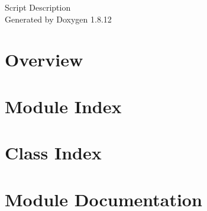 \documentclass[twoside]{book}
\newcommand{\+}{\discretionary{\mbox{\scriptsize$\hookleftarrow$}}{}{}}
\newcommand{\clearemptydoublepage}{%
  \newpage{\pagestyle{empty}\cleardoublepage}%
}
\begin{document}
\hypersetup{pageanchor=false,
             bookmarksnumbered=true,
             pdfencoding=unicode
            }
\begin{titlepage}
\vspace*{7cm}
\begin{center}%
{\Large Script Description }\\
\vspace*{1cm}
{\large Generated by Doxygen 1.8.12}\\
\end{center}
\end{titlepage}
\clearemptydoublepage
{}
\tableofcontents
\clearemptydoublepage
{}
\hypersetup{pageanchor=true}

\chapter{Overview}
\label{index}\hypertarget{index}{}
\chapter{Module Index}

\chapter{Class Index}

\chapter{Module Documentation}












\end{document}
